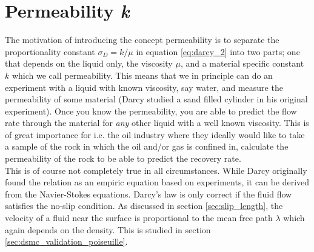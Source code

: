 \section{Permeability \textit{k}}
\label{sec:permeability}
The motivation of introducing the concept permeability is to separate the proportionality constant $\sigma_D = k/\mu$ in equation \eqref{eq:darcy_2} into two parts; one that depends on the liquid only, the viscosity $\mu$, and a material specific constant $k$ which we call permeability. This means that we in principle can do an experiment with a liquid with known viscosity, say water, and measure the permeability of some material (Darcy studied a sand filled cylinder in his original experiment). Once you know the permeability, you are able to predict the flow rate through the material for \textit{any} other liquid with a well known viscosity. This is of great importance for i.e. the oil industry where they ideally would like to take a sample of the rock in which the oil and/or gas is confined in, calculate the permeability of the rock to be able to predict the recovery rate.\\
This is of course not completely true in all circumstances. While Darcy originally found the relation as an empiric equation based on experiments, it can be derived from the Navier-Stokes equations. Darcy's law is only correct if the fluid flow satisfies the no-slip condition. As discussed in section \ref{sec:slip_length}, the velocity of a fluid near the surface is proportional to the mean free path $\lambda$ which again depends on the density. This is studied in section \ref{sec:dsmc_validation_poiseuille}.  
